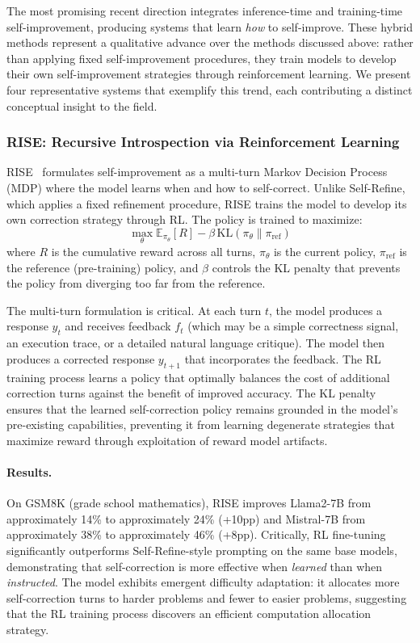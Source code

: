 The most promising recent direction integrates inference-time and training-time self-improvement, producing systems that learn \emph{how} to self-improve. These hybrid methods represent a qualitative advance over the methods discussed above: rather than applying fixed self-improvement procedures, they train models to develop their own self-improvement strategies through reinforcement learning. We present four representative systems that exemplify this trend, each contributing a distinct conceptual insight to the field.


\subsubsection{RISE: Recursive Introspection via Reinforcement Learning}
\label{sec:rise}

RISE~\citep{qu2024rise} formulates self-improvement as a multi-turn Markov Decision Process (MDP) where the model learns when and how to self-correct. Unlike Self-Refine, which applies a fixed refinement procedure, RISE trains the model to develop its own correction strategy through RL. The policy is trained to maximize:
\begin{equation}
    \max_\theta \mathbb{E}_{\pi_\theta}[R] - \beta \, \mathrm{KL}(\pi_\theta \| \pi_{\text{ref}})
    \label{eq:rise-objective}
\end{equation}
where $R$ is the cumulative reward across all turns, $\pi_\theta$ is the current policy, $\pi_{\text{ref}}$ is the reference (pre-training) policy, and $\beta$ controls the KL penalty that prevents the policy from diverging too far from the reference.

The multi-turn formulation is critical. At each turn $t$, the model produces a response $y_t$ and receives feedback $f_t$ (which may be a simple correctness signal, an execution trace, or a detailed natural language critique). The model then produces a corrected response $y_{t+1}$ that incorporates the feedback. The RL training process learns a policy that optimally balances the cost of additional correction turns against the benefit of improved accuracy. The KL penalty ensures that the learned self-correction policy remains grounded in the model's pre-existing capabilities, preventing it from learning degenerate strategies that maximize reward through exploitation of reward model artifacts.

\paragraph{Results.}
On GSM8K (grade school mathematics), RISE improves Llama2-7B from approximately 14\% to approximately 24\% (+10pp) and Mistral-7B from approximately 38\% to approximately 46\% (+8pp). Critically, RL fine-tuning significantly outperforms Self-Refine-style prompting on the same base models, demonstrating that self-correction is more effective when \emph{learned} than when \emph{instructed}. The model exhibits emergent difficulty adaptation: it allocates more self-correction turns to harder problems and fewer to easier problems, suggesting that the RL training process discovers an efficient computation allocation strategy.

